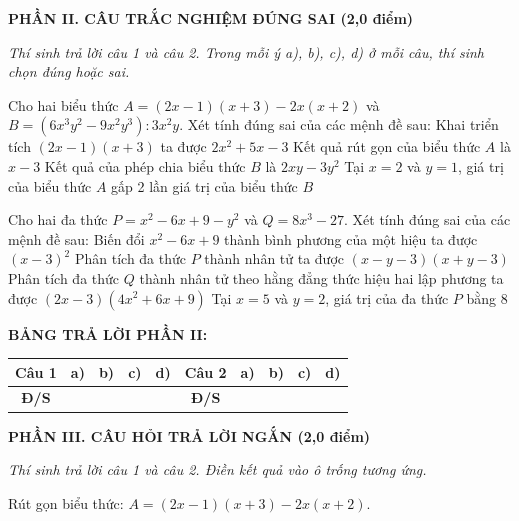 \documentclass[12pt,a4paper]{article}
\begin{document}
\setcounter{ex}{0}
\noindent\textbf{\large PHẦN II. CÂU TRẮC NGHIỆM ĐÚNG SAI (2,0 điểm)}

\textit{Thí sinh trả lời câu 1 và câu 2. Trong mỗi ý a), b), c), d) ở mỗi câu, thí sinh chọn đúng hoặc sai.}

\vspace{1mm}
\begin{ex}
Cho hai biểu thức $A = (2x - 1)(x + 3) - 2x(x + 2)$ và $B = (6x^3y^2 - 9x^2y^3) : 3x^2y$. Xét tính đúng sai của các mệnh đề sau:
\choiceTF
{\True Khai triển tích $(2x - 1)(x + 3)$ ta được $2x^2 + 5x - 3$}
{\True Kết quả rút gọn của biểu thức $A$ là $x - 3$}
{\True Kết quả của phép chia biểu thức $B$ là $2xy - 3y^2$}
{Tại $x = 2$ và $y = 1$, giá trị của biểu thức $A$ gấp 2 lần giá trị của biểu thức $B$}
\end{ex}

\begin{ex}
Cho hai đa thức $P = x^2 - 6x + 9 - y^2$ và $Q = 8x^3 - 27$. Xét tính đúng sai của các mệnh đề sau:
\choiceTF
{\True Biến đổi $x^2 - 6x + 9$ thành bình phương của một hiệu ta được $(x - 3)^2$}
{\True Phân tích đa thức $P$ thành nhân tử ta được $(x - y - 3)(x + y - 3)$}
{\True Phân tích đa thức $Q$ thành nhân tử theo hằng đẳng thức hiệu hai lập phương ta được $(2x - 3)(4x^2 + 6x + 9)$}
{Tại $x = 5$ và $y = 2$, giá trị của đa thức $P$ bằng 8}
\end{ex}


\noindent\textbf{BẢNG TRẢ LỜI PHẦN II:}
\begin{center}
\begin{tabular}{|c|c|c|c|c||c|c|c|c|c|}
\hline
\textbf{Câu 1} & \textbf{a)} & \textbf{b)} & \textbf{c)} & \textbf{d)} & \textbf{Câu 2} & \textbf{a)} & \textbf{b)} & \textbf{c)} & \textbf{d)} \\
\hline
\textbf{Đ/S} & \rule{0pt}{0.6cm} & & & & \textbf{Đ/S} & & & & \\
\hline
\end{tabular}
\end{center}
\vspace{2mm}

\setcounter{ex}{0}
\noindent\textbf{\large PHẦN III. CÂU HỎI TRẢ LỜI NGẮN (2,0 điểm)}

\textit{Thí sinh trả lời câu 1 và câu 2. Điền kết quả vào ô trống tương ứng.}

\vspace{1mm}
\begin{ex}
Rút gọn biểu thức: $A = (2x - 1)(x + 3) - 2x(x + 2)$. 
\end{ex}
\end{document}
